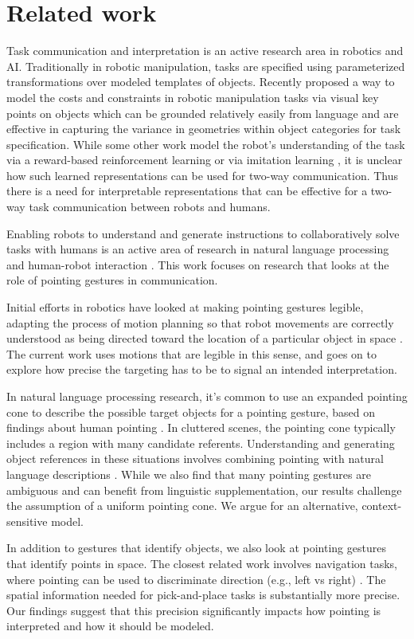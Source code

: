\section{Related work}
\label{related-work}
Task communication and interpretation is an active research area in robotics and AI. Traditionally in robotic manipulation, tasks are specified using parameterized transformations over modeled templates of objects. Recently \cite{manuelli2019kpam} proposed a way to model the costs and constraints in robotic manipulation tasks via visual key points on objects which can be grounded relatively easily from language and are effective in capturing the variance in geometries within object categories for task specification. While some other work model the robot’s understanding of the task via a reward-based reinforcement learning \cite{gualtieri2018pick} or via imitation learning \cite{ghasemipour2019divergence}, it is unclear how such learned representations can be used for two-way communication. Thus there is a need for interpretable representations that can be effective for a two-way task communication between robots and humans.

Enabling robots to understand and generate instructions to collaboratively solve tasks with humans is an active area of research in natural language processing and human-robot interaction \cite{cha2018survey,butepage2017human}.   This work focuses on research that looks at the role of pointing gestures in communication.

Initial efforts in robotics have looked at making pointing gestures legible, adapting the process of motion planning so that robot movements are correctly understood as being directed toward the location of a particular object in space \cite{holladay2014legible,zhao2016experimental}.  The current work uses motions that are legible in this sense, and goes on to explore how precise the targeting has to be to signal an intended interpretation.

In natural language processing research, it's common to use an expanded pointing cone to describe the possible target objects for a pointing gesture, based on findings about human pointing \cite{kranstedt2003deixis,rieser2004pointing}.  In cluttered scenes, the pointing cone typically includes a region with many candidate referents.  Understanding and generating object references in these situations involves combining pointing with natural language descriptions \cite{han2018placing,kollar2014grounding}.  While we also find that many pointing gestures are ambiguous and can benefit from linguistic supplementation, our results challenge the assumption of a uniform pointing cone. We argue for an alternative, context-sensitive model.

In addition to gestures that identify objects, we also look at pointing gestures that identify points in space.  The closest related work involves navigation tasks, where pointing can be used to discriminate direction (e.g., left vs right) \cite{mei2016listen,tellex2011understanding}.  The spatial information needed for pick-and-place tasks is substantially more precise. Our findings suggest that this precision significantly impacts how pointing is interpreted and how it should be modeled.



